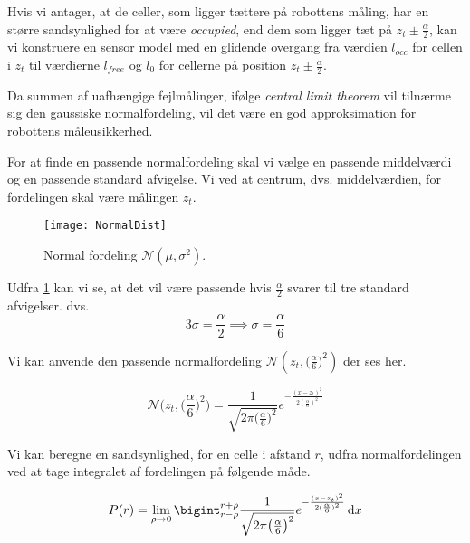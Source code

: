 Hvis vi antager, at de celler, som ligger tættere på robottens måling, har en større sandsynlighed for at være \emph{occupied}, end dem som ligger tæt på $z_t \pm \frac{\alpha}{2}$, kan vi konstruere en sensor model med en glidende overgang fra værdien $l_{occ}$ for cellen i $z_t$ til værdierne $l_{free}$ og $l_0$ for cellerne på position $z_t \pm \frac{\alpha}{2}$. 

Da summen af uafhængige fejlmålinger, ifølge \emph{central limit theorem} vil tilnærme sig
den gaussiske normalfordeling, vil det være en god approksimation for robottens måleusikkerhed.\cite[p. 223]{ArtificialIntelligence}

For at finde en passende normalfordeling skal vi vælge en passende middelværdi og en passende standard afvigelse. 
Vi ved at centrum, dvs. middelværdien, for fordelingen skal være målingen $z_t$.

\begin{figure}
\centering \texttt{[image: NormalDist]}
\caption{Normal fordeling $\mathcal{N}(\mu,\sigma^2)$.}
\label{normaldistimg}
\end{figure}

Udfra \cref{normaldistimg} kan vi se, at det vil være passende hvis $\frac{\alpha}{2}$ svarer til tre standard afvigelser. dvs.
\begin{equation}
	3\sigma = \frac{\alpha}{2} \implies \sigma = \frac{\alpha}{6}
\end{equation}

Vi kan anvende den passende normalfordeling $\mathcal{N}(z_t,\big(\frac{\alpha}{6}\big)^2)$ der ses her. 

\begin{equation}
\mathcal{N}\bigg(z_t,\bigg(\frac{\alpha}{6}\bigg)^2\bigg) = 
\frac{1}{\sqrt{2 \pi \big(\frac{\alpha}{6}\big)^2}}e^{- \frac{(x - z_t)^2}{2 (\frac{\alpha}{6})^2}}
\end{equation}

Vi kan beregne en sandsynlighed, for en celle i afstand $r$, udfra normalfordelingen ved at tage integralet af fordelingen på følgende måde.

\begin{equation}
P(r) = \lim \limits_{\rho \to 0} \bigint_{r-\rho}^{r+\rho} \frac{1}{\sqrt{2 \pi \big(\frac{\alpha}{6}\big)^2}}e^{- \frac{(x - z_t)^2}{2 (\frac{\alpha}{6})^2}}\, \mathrm{d}x
\end{equation}


